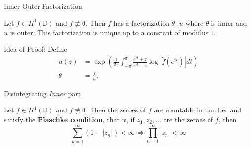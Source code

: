 \documentclass{beamer}
\numberwithin{equation}{subsection}
\newcommand{\D}{\mathbb D}
\newcommand{\abs}[1]{\left\lvert #1 \right\rvert}
\begin{document}
\begin{frame}{Inner Outer Factorization}
    \begin{theorem}
	Let $f\in H^{1} \left( \D \right)$ and $f\not\equiv 0$. Then $f$ has a factorization $\theta \cdot u$ where $\theta$ is inner and $u$ is outer. This factorization is unique up to a constant of modulus $1$.
	\label{thm:inner-outer-not-complete}
    \end{theorem}
    \pause
    Idea of Proof: Define
    \begin{align*}
	u(z) &= \exp \left( \frac{1}{2\pi} \int_{-\pi}^{\pi} \frac{e^{it}+z}{e^{it}-z} \log \abs{\tilde{f}\left( e^{it} \right)} dt \right) \\
	\theta &= \frac{f}{u}.
    \end{align*}
\end{frame}

\begin{frame}{Disintegrating \textit{Inner} part}
    \begin{theorem}
	Let $f \in H^{1}\left( \D \right)$ and $f\not\equiv 0$. Then the zeroes of $f$ are countable in number and satisfy the \textbf{Blaschke condition}, that is, if $z_{1}, z_{2}, \ldots$ are the zeroes of $f$, then
    \begin{equation*}
	\sum_{k=1}^{\infty} \left( 1-\abs{z_{n}} \right) < \infty \Longleftrightarrow \prod_{n=1}^{\infty} \abs{z_{n}} < \infty
    \end{equation*}
    \end{theorem}
\end{frame}
\end{document}
